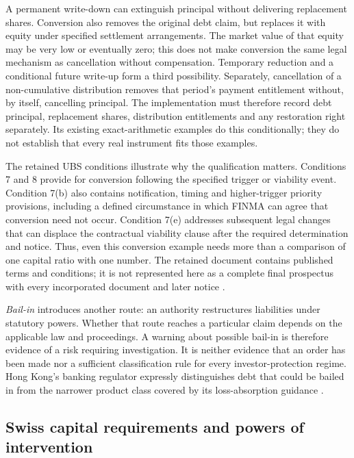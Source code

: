 A permanent write-down can extinguish principal without delivering replacement
shares. Conversion also removes the original debt claim, but replaces it with
equity under specified settlement arrangements. The market value of that equity
may be very low or eventually zero; this does not make conversion the same legal
mechanism as cancellation without compensation. Temporary reduction and a
conditional future write-up form a third possibility. Separately, cancellation
of a non-cumulative distribution removes that period's payment entitlement
without, by itself, cancelling principal. The implementation must therefore
record debt principal, replacement shares, distribution entitlements and any
restoration right separately. Its existing exact-arithmetic examples do this
conditionally; they do not establish that every real instrument fits those
examples.

The retained UBS conditions illustrate why the qualification matters. Conditions
7 and 8 provide for conversion following the specified trigger or viability
event. Condition 7(b) also contains notification, timing and higher-trigger
priority provisions, including a defined circumstance in which FINMA can agree
that conversion need not occur. Condition 7(e) addresses subsequent legal changes
that can displace the contractual viability clause after the required
determination and notice. Thus, even this conversion example needs more than a
comparison of one capital ratio with one number. The retained document contains
published terms and conditions; it is not represented here as a complete final
prospectus with every incorporated document and later notice
\citep[conditions~7--8, PDF pp.~25--29]{ubsat12024}.

\emph{Bail-in} introduces another route: an authority restructures liabilities
under statutory powers. Whether that route reaches a particular claim depends
on the applicable law and proceedings. A warning about possible bail-in is
therefore evidence of a risk requiring investigation. It is neither evidence
that an order has been made nor a sufficient classification rule for every
investor-protection regime. Hong Kong's banking regulator expressly distinguishes
debt that could be bailed in from the narrower product class covered by its
loss-absorption guidance \citep[questions~1--4]{hkmalacfaq2022}.

\subsection{Swiss capital requirements and powers of intervention}

